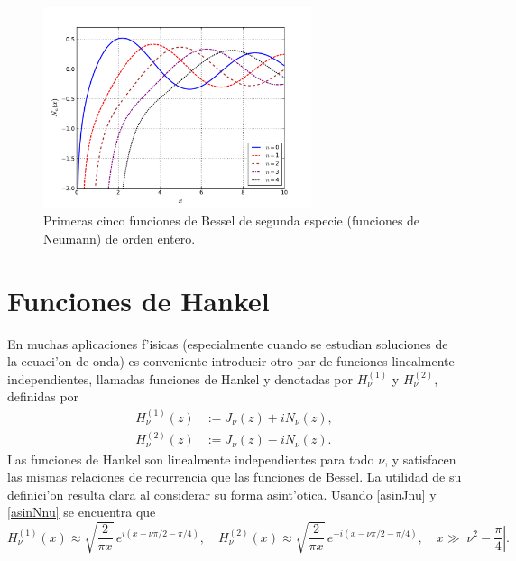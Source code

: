 \begin{figure}[H]
\centering
\includegraphics[angle=0,width=0.7\textwidth]{figs/fig-Bessel-N.pdf}
\caption{Primeras cinco funciones de Bessel de segunda especie (funciones de Neumann) de orden entero.}
\label{fig-Nn}
\end{figure}

\section{Funciones de Hankel}
En muchas aplicaciones f'isicas (especialmente cuando se estudian soluciones de la ecuaci'on de onda) es conveniente introducir otro par de funciones linealmente independientes, llamadas funciones de Hankel y denotadas por $H_\nu^{(1)}$ y $H_\nu^{(2)}$, definidas por
\begin{align}
  H_\nu^{(1)}(z) &:= J_\nu(z) + i N_\nu(z),  \\
  H_\nu^{(2)}(z) &:= J_\nu(z) - i N_\nu(z) .
\end{align}
Las funciones de Hankel son linealmente independientes para todo $\nu$, y satisfacen las mismas relaciones de recurrencia que las funciones de Bessel.
La utilidad de su definici'on resulta clara al considerar su forma asint'otica. Usando \eqref{asinJnu} y \eqref{asinNnu} se encuentra que
\begin{equation}
H_\nu^{(1)}(x)\approx \sqrt{\frac{2}{\pi x}}\,e^{i(x-\nu\pi/2-\pi/4)}, \quad 
H_\nu^{(2)}(x)\approx \sqrt{\frac{2}{\pi x}}\,e^{-i(x-\nu\pi/2-\pi/4)}, 
\quad x\gg\left|\nu^2-\frac{\pi}{4}\right|.
\end{equation}


